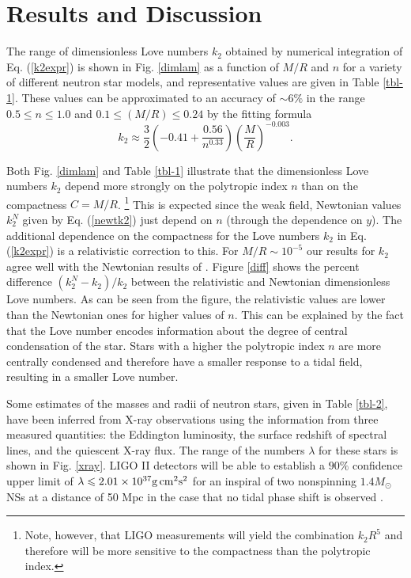 \documentclass[12pt,preprint]{aastex}
\begin{document}
{\section{Results and Discussion}
\label{sec:results}

The range of dimensionless Love numbers $k_2$ obtained by numerical
integration of Eq. (\ref{k2expr}) is shown in Fig. \ref{dimlam} as a
function of $M/R$ and $n$ for a variety of different neutron star
models, and representative values are given in Table \ref{tbl-1}.
These values can be approximated to an accuracy of $\sim 6\%$ in the
range $0.5\leq n\leq 1.0$ and $0.1\leq (M/R)\leq 0.24$ by the
fitting formula
\begin{equation} k_2\approx \frac{3}{2}
\left(-0.41+\frac{0.56}{n^{0.33}}\right)\left(\frac{M}{R}\right)^{-0.003}.\end{equation}

Both Fig. \ref{dimlam} and Table \ref{tbl-1} illustrate that the
dimensionless Love numbers $k_2$ depend more strongly on the
polytropic index $n$ than on the compactness $C=M/R$.
\footnote{Note, however, that LIGO measurements will yield the
combination $k_2 R^5$ and therefore will be more sensitive to the
compactness than the polytropic index.} This is expected since the
weak field, Newtonian values $k_2^N$ given by Eq. (\ref{newtk2})
just depend on $n$ (through the dependence on $y$). The additional
dependence on the compactness for the Love numbers $k_2$ in Eq.
(\ref{k2expr}) is a relativistic correction to this. For $M/R\sim
10^{-5}$ our results for $k_2$ agree well with the Newtonian results
of \citet{bo}. Figure \ref{diff} shows the percent difference
$(k_2^N-k_2)/k_2$ between the relativistic and Newtonian
dimensionless Love numbers. As can be seen from the figure, the
relativistic values are lower than the Newtonian ones for higher
values of $n$. This can be explained by the fact that the Love
number encodes information about the degree of central condensation
of the star. Stars with a higher the polytropic index $n$ are more
centrally condensed and therefore have a smaller response to a tidal
field, resulting in a smaller Love number.





Some estimates of the masses and radii of neutron stars, given in
Table \ref{tbl-2}, have been inferred from X-ray observations
\citep{nature,astroph} using the information from three measured
quantities: the Eddington luminosity, the surface redshift of
spectral lines, and the quiescent X-ray flux. The range of the
numbers $\lambda$ for these stars is shown in Fig. \ref{xray}. LIGO
II detectors will be able to establish a $90\%$ confidence upper
limit of $\lambda \leqslant 2.01 \times 10^{37} {\rm g}{\,}{\rm
cm}^2{\rm s}^2 $ for an inspiral of two nonspinning $1.4 M_\odot$
NSs at a distance of 50 Mpc in the case that no tidal phase shift is
observed \citep{tidal}.


}
\end{document}
